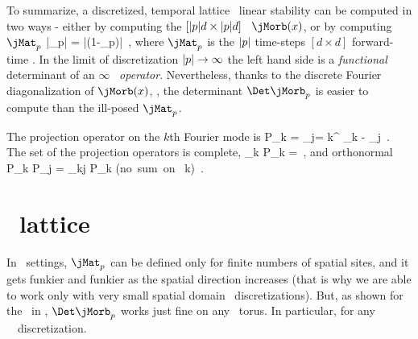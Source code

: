   
\newpage %
  
\newpage %
  

\newpage %
  
\newpage %
  
\newpage %

\bigskip

To summarize, a discretized, temporal lattice \po\ linear stability can
be computed in two ways - either by computing the
$[{|p|}d\times{\ensuremath{|p|}}d]$ \jacobianM\ $\jMorb(x)$, or by computing $\jMat_p$
\beq
|\Det \jMorb_p| = |\det (1-\jMat_p)|
\,,
where $\jMat_p$ is the ${|p|}$ time-steps $[d\!\times\!d]$ forward-time
\jacobianM. In the limit of discretization ${|p|}\to\infty$ the left
hand side is a {\em functional} determinant of an $\infty$\dmn\ {\em
operator}. Nevertheless, thanks to the discrete Fourier diagonalization
of $\jMorb(x)$, , the determinant $\Det \jMorb_p$ is easier to compute
than the ill-posed $\jMat_p$.

The projection operator on the $k$th Fourier mode is
\beq
P_k = \prod_{j\not= k}^{} 
                           {\omega_k - \omega_j}
\,.
The set of the projection operators is complete,
\beq
\sum_k P_k = \id
\,,
\label{compl-ProjOp}
\eeq
 and orthonormal
\beq
P_k P_j = \delta_{kj} P_k
 \qquad (\hbox{no sum on} \ k)
\label{orthon-ProjOp}
\,.
\eeq
[TO BE CONTINUED]


\section{\Spt\ lattice}
\label{s:SptLatt}

In \spt\ settings, $\jMat_p$ can be defined only for finite numbers of
spatial sites, and it gets funkier and funkier as the spatial direction
increases (that is why we are able to work only with very small spatial
domain \KS\ discretizations). But, as shown for the \catlatt\ in
, $\Det \jMorb_p$ works just fine on any
\spt\ torus. In particular, for any \twot\ \KS\ discretization.


